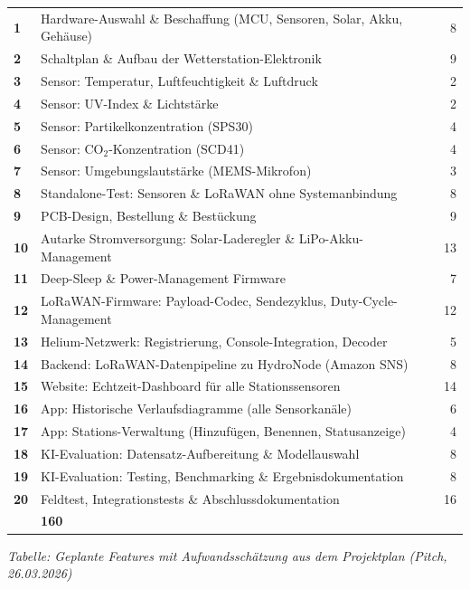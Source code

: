 \begin{longtable}{>{\bfseries}p{0.5cm} p{13.5cm} r}
  1  & Hardware-Auswahl \& Beschaffung (MCU, Sensoren, Solar, Akku, Gehäuse) & 8 \\
  \rowcolor{rowgray}
  2  & Schaltplan \& Aufbau der Wetterstation-Elektronik & 9 \\
  3  & Sensor: Temperatur, Luftfeuchtigkeit \& Luftdruck & 2 \\
  \rowcolor{rowgray}
  4  & Sensor: UV-Index \& Lichtstärke & 2 \\
  5  & Sensor: Partikelkonzentration (SPS30) & 4 \\
  \rowcolor{rowgray}
  6  & Sensor: CO${}_2$-Konzentration (SCD41) & 4 \\
  7  & Sensor: Umgebungslautstärke (MEMS-Mikrofon) & 3 \\
  \rowcolor{rowgray}
  8  & Standalone-Test: Sensoren \& LoRaWAN ohne Systemanbindung & 8 \\
  9  & PCB-Design, Bestellung \& Bestückung & 9 \\
  \rowcolor{rowgray}
  10 & Autarke Stromversorgung: Solar-Laderegler \& LiPo-Akku-Management & 13 \\
  11 & Deep-Sleep \& Power-Management Firmware & 7 \\
  \rowcolor{rowgray}
  12 & LoRaWAN-Firmware: Payload-Codec, Sendezyklus, Duty-Cycle-Management & 12 \\
  13 & Helium-Netzwerk: Registrierung, Console-Integration, Decoder & 5 \\
  \rowcolor{rowgray}
  14 & Backend: LoRaWAN-Datenpipeline zu HydroNode (Amazon SNS) & 8 \\
  15 & Website: Echtzeit-Dashboard für alle Stationssensoren & 14 \\
  \rowcolor{rowgray}
  16 & App: Historische Verlaufsdiagramme (alle Sensorkanäle) & 6 \\
  17 & App: Stations-Verwaltung (Hinzufügen, Benennen, Statusanzeige) & 4 \\
  \rowcolor{rowgray}
  18 & KI-Evaluation: Datensatz-Aufbereitung \& Modellauswahl & 8 \\
  19 & KI-Evaluation: Testing, Benchmarking \& Ergebnisdokumentation & 8 \\
  \rowcolor{rowgray}
  20 & Feldtest, Integrationstests \& Abschlussdokumentation & 16 \\
  \midrule
  \multicolumn{2}{r}{\textbf{Gesamt}} & \textbf{160} \\
\end{longtable}
\vspace{-1em}
\begin{center}
  \small\textit{Tabelle: Geplante Features mit Aufwandsschätzung aus dem Projektplan (Pitch, 26.03.2026)}
  \label{tab:features}
\end{center}


